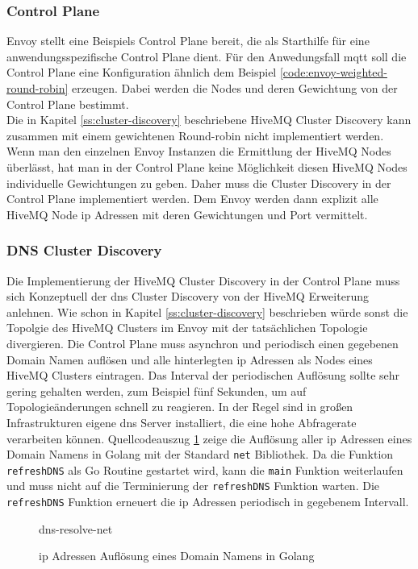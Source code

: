 \subsubsection{Control Plane}
Envoy stellt eine Beispiels Control Plane \cite{DynamicConfigurationControl} bereit, die als Starthilfe für eine anwendungsspezifische Control Plane dient. Für den Anwedungsfall \ac{mqtt} soll die Control Plane eine Konfiguration ähnlich dem Beispiel \ref{code:envoy-weighted-round-robin} erzeugen. Dabei werden die Nodes und deren Gewichtung von der Control Plane bestimmt.
\\
Die in Kapitel \ref{ss:cluster-discovery} beschriebene HiveMQ Cluster Discovery kann zusammen mit einem gewichtenen Round-robin nicht implementiert werden. Wenn man den einzelnen Envoy Instanzen die Ermittlung der HiveMQ Nodes überlässt, hat man in der Control Plane keine Möglichkeit diesen HiveMQ Nodes individuelle Gewichtungen zu geben. Daher muss die Cluster Discovery in der Control Plane implementiert werden. Dem Envoy werden dann explizit alle HiveMQ Node \ac{ip} Adressen mit deren Gewichtungen und Port vermittelt.

\subsubsection{DNS Cluster Discovery} \label{ss:dns-discovery}
Die Implementierung der HiveMQ Cluster Discovery in der Control Plane muss sich Konzeptuell der \ac{dns} Cluster Discovery von der HiveMQ Erweiterung anlehnen. Wie schon in Kapitel \ref{ss:cluster-discovery} beschrieben würde sonst die Topolgie des HiveMQ Clusters im Envoy mit der tatsächlichen Topologie divergieren.
Die Control Plane muss asynchron und periodisch einen gegebenen Domain Namen auflösen und alle hinterlegten \ac{ip} Adressen als Nodes eines HiveMQ Clusters eintragen. Das Interval der periodischen Auflösung sollte sehr gering gehalten werden, zum Beispiel fünf Sekunden, um auf Topologieänderungen schnell zu reagieren. In der Regel sind in gro{\ss}en Infrastrukturen eigene \ac{dns} Server installiert, die eine hohe Abfragerate verarbeiten können.
Quellcodeauszug \ref{code:dns-resolve-net} zeige die Auflösung aller \ac{ip} Adressen eines Domain Namens in Golang mit der Standard \verb|net| Bibliothek. Da die Funktion \verb|refreshDNS| als Go Routine gestartet wird, kann die \verb|main| Funktion weiterlaufen und muss nicht auf die Terminierung der \verb|refreshDNS| Funktion warten. Die \verb|refreshDNS| Funktion erneuert die \ac{ip} Adressen periodisch in gegebenem Intervall.
\begin{figure}
    {dns-resolve-net}
    \caption{\ac{ip} Adressen Auflösung eines Domain Namens in Golang}
    \label{code:dns-resolve-net}
\end{figure}

